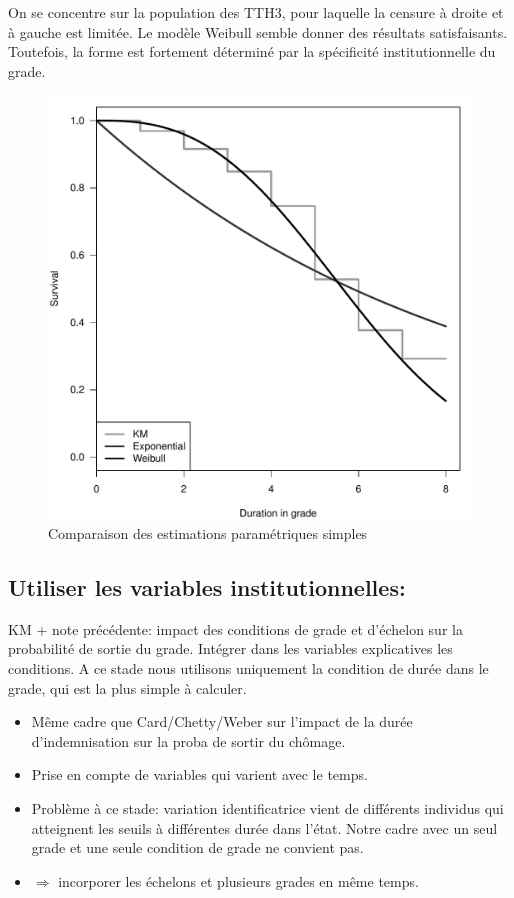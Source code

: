 \documentclass[11pt,a4paper]{article}
\begin{document}
On se concentre sur la population des TTH3, pour laquelle la censure à droite et à gauche est limitée. Le modèle Weibull semble donner des résultats satisfaisants. Toutefois, la forme est fortement déterminé par la spécificité institutionnelle du grade. 


\begin{figure}[H] 
  \caption{Comparaison des estimations paramétriques simples}
    \includegraphics[scale = 0.6]{comp.pdf} 
\end{figure}




\subsection*{Utiliser les variables institutionnelles:}

KM + note précédente: impact des conditions de grade et d'échelon sur la probabilité de sortie du grade. Intégrer dans les variables explicatives les conditions. 
A ce stade nous utilisons uniquement la condition de durée dans le grade, qui est la plus simple à calculer. 

\begin{itemize}[leftmargin=1cm ,parsep=0cm,itemsep=0cm,topsep=0cm] 
\item Même cadre que Card/Chetty/Weber sur l'impact de la durée d'indemnisation sur la proba de sortir du chômage. 
\item Prise en compte de variables qui varient avec le temps. 
\item Problème à ce stade: variation identificatrice vient de différents individus qui atteignent les seuils à différentes durée dans l'état. Notre cadre avec un seul grade et une seule condition de grade ne convient pas. 
\item[] $\Rightarrow$ incorporer les échelons et plusieurs grades en même temps. 
\end{itemize}
\end{document}
